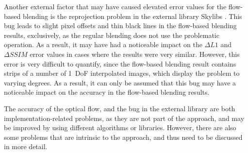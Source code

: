 
Another external factor that may have caused elevated error values for the flow-based blending is the reprojection problem in the external library Skylibs \cite{skylibs}. This bug leads to slight pixel offsets and thin black lines in the flow-based blending results, exclusively, as the regular blending does not use the problematic operation. As a result, it may have had a noticeable impact on the $\Delta L1$ and $\Delta SSIM$ error values in cases where the results were very similar. However, this error is very difficult to quantify, since the flow-based blending result contains strips of a number of 1~DoF interpolated images, which display the problem to varying degrees. As a result, it can only be assumed that this bug may have a noticeable impact on the accuracy in the flow-based blending results.

The accuracy of the optical flow, and the bug in the external library are both implementation-related problems, as they are not part of the approach, and may be improved by using different algorithms or libraries. However, there are also some problems that are intrinsic to the approach, and thus need to be discussed in more detail.

